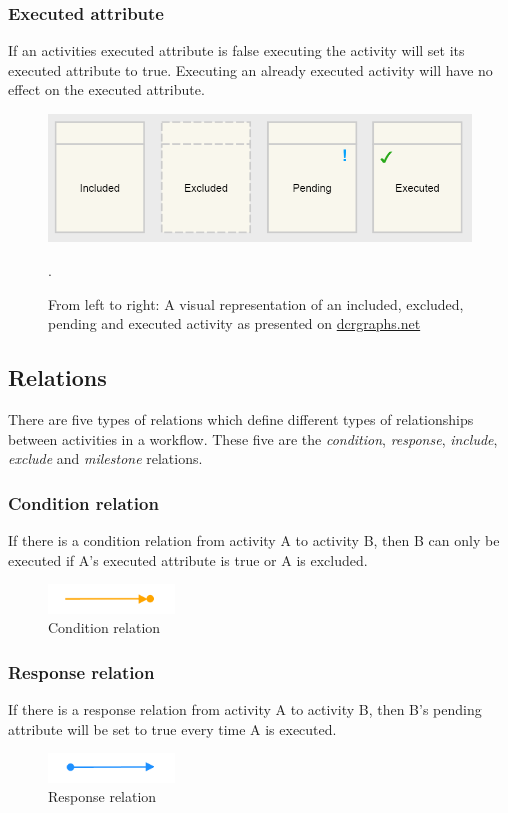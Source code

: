\documentclass{article}
\begin{document}
	\subsubsection{Executed attribute}
	If an activities executed attribute is false executing the activity will set its executed attribute to true.
	Executing an already executed activity will have no effect on the executed attribute.

	\begin{figure}[!ht]
		\centering
		\includegraphics[width=1\textwidth]{figures/activity_states.png}
	 	\caption[Activity States]
	 	{From left to right: A visual representation of an included, excluded, pending and executed activity as presented on \href{http://www.dcrgraphs.net}{dcrgraphs.net}}.
	\end{figure}

	\subsection{Relations}
	There are five types of relations which define different types of relationships between activities in a workflow. 
	These five are the \emph{condition}, \emph{response}, \emph{include}, \emph{exclude} and \emph{milestone} relations.

	\subsubsection{Condition relation}
	If there is a condition relation from activity A to activity B, then B can only be executed if A's executed attribute is true or A is excluded.
	\begin{figure}[!ht]
		\centering
		\includegraphics[width=0.3\textwidth]{figures/ConditionRelation.png}
	 	\caption[Condition relation]
	 	{Condition relation}
	\end{figure}

	\subsubsection{Response relation}
	If there is a response relation from activity A to activity B, then B's pending attribute will be set to true every time A is executed.
	\begin{figure}[!ht]
		\centering
		\includegraphics[width=0.3\textwidth]{figures/ResponseRelation.png}
	 	\caption[Response relation]
	 	{Response relation}
	\end{figure}
\end{document}
